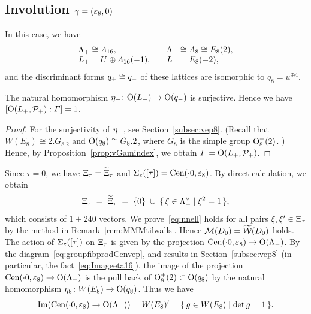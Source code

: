 \documentclass{amsart} %
\begin{document}
\subsection{Involution $\gamma=(\varepsilon_8, 0)$}\label{subsec:walls8}
%
In this case, we have
\[
\begin{array}{ll}
\Lambda_{+}\cong \varLambda_{16}, \quad &\Lambda_{-}\cong \varLambda_{8}\cong E_8(2),\\
L_{+}= U\oplus \varLambda_{16}(-1), \quad &L_{-}= E_8(-2),
\end{array}
\]
%
and the discriminant forms $q_{+}\cong q_{-}$ of these lattices are 
isomorphic to $q_8=u^{\oplus 4}$.
%
\begin{proposition}\label{prop:indexvep8}
The natural homomorphism ${\eta}_{-}\colon \mathord{\mathrm{O}}(L_{-})\to \mathord{\mathrm{O}}(q_{-})$ is surjective.
Hence we have $[\mathord{\mathrm{O}}(L_{+}, \mathord{\mathcal{P}}_{+}): \varGamma]=1$.
\end{proposition}
%
\begin{proof}
For the surjectivity of ${\eta}_{-}$, see Section~\ref{subsec:vep8}.
(Recall that $W(E_8)\cong2.G_8.2$ and $\mathord{\mathrm{O}}(q_8)\cong G_8.2$, where $G_8$ is the simple group $\mathord{\mathrm{O}}^+_8(2)$. )
Hence, by Proposition~\ref{prop:vGamindex}, we obtain $\varGamma=\mathord{\mathrm{O}}(L_{+}, \mathord{\mathcal{P}}_{+})$.
\end{proof}
%
Since $\tau=0$,
we have $\Xi_{\tau}=\widetilde{\Xi}_{\tau} $ and $\Sigma_{\varepsilon}([\tau])=\mathrm{Cen}(\cdot 0, \varepsilon_{8})$.
By direct calculation, we obtain 
\[
\Xi_{\tau}\;=\;\widetilde{\Xi}_{\tau} \; =\; \{0\}\;\cup\;\{\,{\xi\in \Lambda_{-}^{\vee}}\mid {\xi^2=1} \,\},
\]
which consists of $1+240$ vectors.
We prove~\eqref{eq:nnell} holds for all pairs $\xi, \xi^{\prime}\in \Xi_{\tau}$
by the method in Remark~\ref{rem:MMMtilwalls}.
Hence 
$\mathord{\mathcal{M}}(D_0)=\widetilde{\mathord{\mathcal{W}}}(D_0)$ holds.
%
%
%
The action of $\Sigma_{\varepsilon}([\tau])$ on $\Xi_{\tau}$
is given by the projection 
$\mathrm{Cen}(\cdot 0, \varepsilon_{8})\to \mathord{\mathrm{O}}(\Lambda_{-})$.
By the diagram~\eqref{eq:groupfibprodCenvep}, and results in Section~\ref{subsec:vep8}
(in particular, the fact~\eqref{eq:Imageeta16}), 
the image of the projection  $\mathrm{Cen}(\cdot 0, \varepsilon_{8})\to \mathord{\mathrm{O}}(\Lambda_{-})$ is 
the pull back of $\mathord{\mathrm{O}}^{+}_8(2)\subset \mathord{\mathrm{O}}(q_8)$ by the natural homomorphism 
$\eta_8\colon W(E_8)\to \mathord{\mathrm{O}}(q_8)$.
Thus we have 
\[
\operatorname{Im}(\mathrm{Cen}(\cdot 0, \varepsilon_{8})\to \mathord{\mathrm{O}}(\Lambda_{-}) )=W(E_8)^{\prime}=\{\,{g\in W(E_8)}\mid {\det g=1} \,\}.
\]
\end{document}
